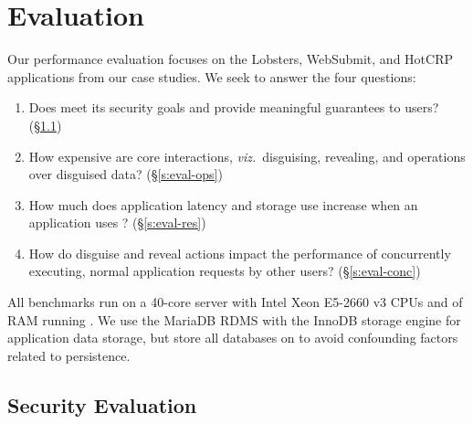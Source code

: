 \section{Evaluation}
\label{s:eval}

%
Our performance evaluation focuses on the Lobsters, WebSubmit, and HotCRP applications
from our case studies.
%
We seek to answer the four questions:
%
\begin{enumerate}[nosep]
 \item Does \sys meet its security goals and provide meaningful guarantees to users?
   (\S\ref{s:eval-security})
 \item How expensive are core \sys interactions, \emph{viz.}\ disguising, revealing, and
   operations over disguised data? (\S\ref{s:eval-ops})
 \item How much does application latency and storage use increase when an application
   uses \sys? (\S\ref{s:eval-res})
 \item How do disguise and reveal actions impact the performance of concurrently executing,
   normal application requests by other users? (\S\ref{s:eval-conc})
\end{enumerate}
%
All benchmarks run on a 40-core server with Intel Xeon E5-2660 v3 CPUs and  of RAM
running .
%
We use the MariaDB RDMS with the InnoDB storage engine for application data storage, but
store all databases on  to avoid confounding factors related to persistence.
%

\subsection{Security Evaluation}
\label{s:eval-security}

